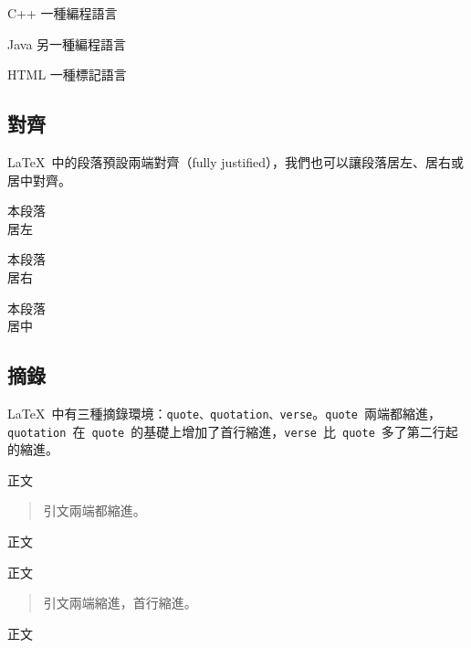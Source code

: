 \begin{demo}
\begin{description}
    \item{C++} 一種編程語言
    \item{Java} 另一種編程語言
    \item{HTML} 一種標記語言
\end{description}
\end{demo}

\subsection{對齊}
\LaTeX~中的段落預設兩端對齊（fully justified），我們也可以讓段落居左、居右或居中對齊。

\begin{demo}
\begin{flushleft}
本段落\\
居左
\end{flushleft}
\end{demo}

\begin{demo}
\begin{flushright}
本段落\\
居右
\end{flushright}
\end{demo}

\begin{demo}
\begin{center}
本段落\\
居中
\end{center}
\end{demo}

\subsection{摘錄}
\LaTeX~中有三種摘錄環境：\verb|quote、quotation、verse|。\verb|quote|~兩端都縮進，\verb|quotation|~在~\verb|quote|~的基礎上增加了首行縮進，\verb|verse|~比~\verb|quote|~多了第二行起的縮進。

\begin{demo}
正文
\begin{quote}
引文兩端都縮進。
\end{quote}
正文
\end{demo}

\begin{demo}
正文
\begin{quotation}
引文兩端縮進，首行縮進。
\end{quotation}
正文
\end{demo}

